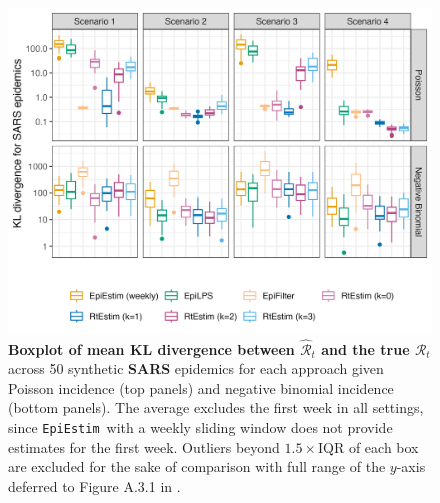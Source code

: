 \documentclass[10pt,letterpaper]{article}
\def\EpiEstim{\texttt{EpiEstim}}
\def\calR{\mathcal{R}}
\renewcommand{\hat}{\widehat}
\begin{document}
\begin{figure}[!t]
  \centering
  \includegraphics[width=1.0\linewidth]{fig/Fig4.png}
  \caption{{\bf Boxplot of mean KL divergence between $\hat{\calR}_t$ and the true
  $\calR_t$} across 50 synthetic {\bf SARS} epidemics for each approach given Poisson
  incidence (top panels) and negative binomial incidence (bottom panels). The
  average excludes the first week in all settings, since \EpiEstim\ with a
  weekly sliding window does not provide estimates for the first week. Outliers
  beyond $1.5\times$IQR of each box are excluded for the sake of comparison with
  full range of the $y$-axis deferred to Figure A.3.1 in .} 
  \label{fig:kl-res-sars}
\end{figure}
\end{document}

